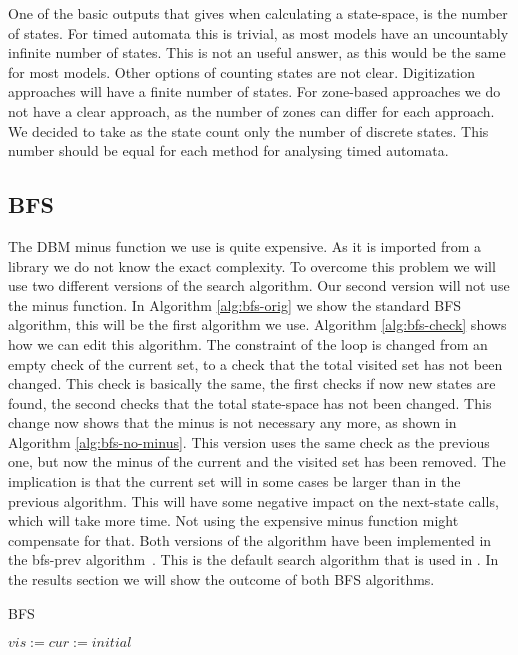 One of the basic outputs that \ltsmin{} gives when calculating a state-space, is the number of states. For timed automata this is trivial, as most models have an uncountably infinite number of states. This is not an useful answer, as this would be the same for most models. Other options of counting states are not clear. Digitization approaches will have a finite number of states. For zone-based approaches we do not have a clear approach, as the number of zones can differ for each approach. We decided to take as the state count only the number of discrete states. This number should be equal for each method for analysing timed automata.

\subsection{BFS}
\label{subsection:bfs}
The DBM minus function we use is quite expensive. As it is imported from a library we do not know the exact complexity. To overcome this problem we will use two different versions of the search algorithm. Our second version will not use the minus function. In Algorithm \ref{alg:bfs-orig} we show the standard BFS algorithm, this will be the first algorithm we use. Algorithm \ref{alg:bfs-check} shows how we can edit this algorithm. The constraint of the loop is changed from an empty check of the current set, to a check that the total visited set has not been changed. This check is basically the same, the first checks if now new states are found, the second checks that the total state-space has not been changed. This change now shows that the minus is not necessary any more, as shown in Algorithm \ref{alg:bfs-no-minus}. This version uses the same check as the previous one, but now the minus of the current and the visited set has been removed. The implication is that the current set will in some cases be larger than in the previous algorithm. This will have some negative impact on the next-state calls, which will take more time. Not using the expensive minus function might compensate for that. Both versions of the algorithm have been implemented in the bfs-prev algorithm~\cite{rwcmatrices}. This is the default search algorithm that is used in \ltsmin{}. In the results section we will show the outcome of both BFS algorithms. 

\begin{algorithm}
\caption{BFS}\label{alg:bfs-orig}
\begin{algorithmic}[1]
	\State $vis := cur := initial$
	\EndWhile
	
\EndProcedure	
\end{algorithmic}
\end{algorithm}

